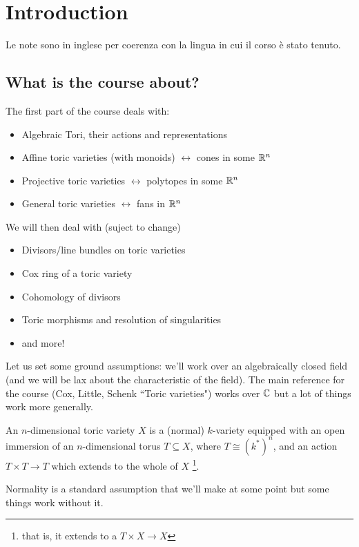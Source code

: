 \chapter*{Introduction}
\begin{center}
Le note sono in inglese per coerenza con la lingua in cui il corso \`e stato tenuto.    
\end{center}

\section*{What is the course about?}
The first part of the course deals with:
\begin{itemize}
    \item Algebraic Tori, their actions and representations
    \item Affine toric varieties (with monoids) $\leftrightarrow$ cones in some $\mathbb{R}^n$
    \item Projective toric varieties $\leftrightarrow$ polytopes in some $\mathbb{R}^n$
    \item General toric varieties $\leftrightarrow$ fans in $\mathbb{R}^n$
\end{itemize}
We will then deal with (suject to change)
\begin{itemize}
    \item Divisors/line bundles on toric varieties
    \item Cox ring of a toric variety
    \item Cohomology of divisors
    \item Toric morphisms and resolution of singularities
    \item and more!
\end{itemize}


Let us set some ground assumptions: we'll work over an algebraically closed field (and we will be lax about the characteristic of the field). The main reference for the course (Cox, Little, Schenk ``Toric varieties") works over $\mathbb{C}$ but a lot of things work more generally.


\begin{definition}
An $n$-dimensional toric variety $X$ is a (normal) $k$-variety equipped with an open immersion of an $n$-dimensional torus $T\subseteq X$, where $T\cong (k^\ast)^n$, and an action $T\times T\to T$ which extends to the whole of $X$ \footnote{that is, it extends to a $T\times X\to X$}.
\end{definition}

\begin{remark}
Normality is a standard assumption that we'll make at some point but some things work without it.
\end{remark}

